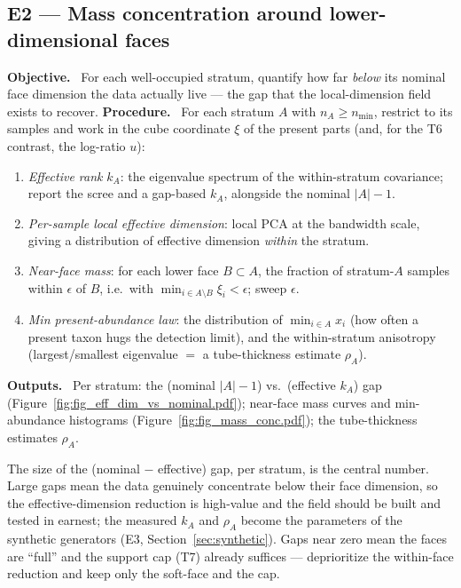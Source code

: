 \documentclass[11pt]{article}
\theoremstyle{definition}
\newcommand{\field}[1]{\smallskip\noindent\textbf{\textsf{#1.}}\ }
\begin{document}
\subsection{E2 --- Mass concentration around lower-dimensional faces}\label{sec:E2}
\field{Objective} For each well-occupied stratum, quantify how far \emph{below} its
nominal face dimension the data actually live --- the gap that the local-dimension
field exists to recover.
\field{Procedure} For each stratum $A$ with $n_A\ge n_{\min}$, restrict to its
samples and work in the cube coordinate $\xi$ of the present parts (and, for the
T6 contrast, the log-ratio $u$):
\begin{enumerate}[leftmargin=1.5em,nosep]
\item \emph{Effective rank} $k_A$: the eigenvalue spectrum of the within-stratum
covariance; report the scree and a gap-based $k_A$, alongside the nominal $|A|-1$.
\item \emph{Per-sample local effective dimension}: local PCA at the bandwidth
scale, giving a distribution of effective dimension \emph{within} the stratum.
\item \emph{Near-face mass}: for each lower face $B\subset A$, the fraction of
stratum-$A$ samples within $\epsilon$ of $B$, i.e.\ with $\min_{i\in A\setminus
B}\xi_i<\epsilon$; sweep $\epsilon$.
\item \emph{Min present-abundance law}: the distribution of $\min_{i\in A}x_i$
(how often a present taxon hugs the detection limit), and the within-stratum
anisotropy (largest/smallest eigenvalue $=$ a tube-thickness estimate $\rho_A$).
\end{enumerate}
\field{Outputs} Per stratum: the (nominal $|A|-1$) vs.\ (effective $k_A$) gap
(Figure~\ref{fig:fig_eff_dim_vs_nominal.pdf}); near-face mass curves and
min-abundance histograms (Figure~\ref{fig:fig_mass_conc.pdf}); the tube-thickness
estimates $\rho_A$.
\begin{decision}
The size of the (nominal $-$ effective) gap, per stratum, is the central number.
Large gaps mean the data genuinely concentrate below their face dimension, so the
effective-dimension reduction is high-value and the field should be built and
tested in earnest; the measured $k_A$ and $\rho_A$ become the parameters of the
synthetic generators (E3, Section~\ref{sec:synthetic}). Gaps near zero mean the
faces are ``full'' and the support cap (T7) already suffices --- deprioritize the
within-face reduction and keep only the soft-face and the cap.
\end{decision}
\end{document}
